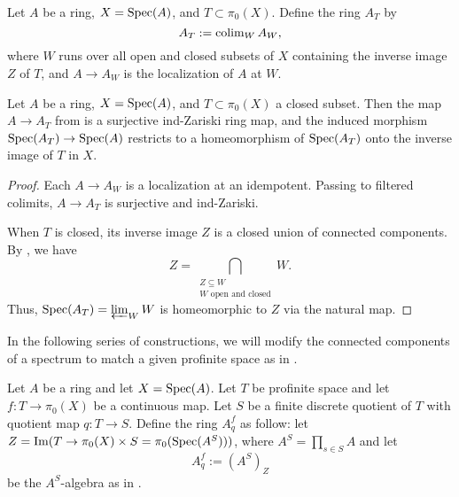\begin{definition}
  \label{def:colim-open-closed-localizations}
  Let $A$ be a ring, $X = \operatorname{Spec}(A)$, and $T \subset \pi_0(X)$. Define the ring $A_T$ by
  \[ 
    A_T := \operatorname{colim}_{W} A_W,
  \]
  where $W$ runs over all open and closed subsets of $X$ containing the inverse image $Z$ of $T$, and $A \to A_W$ is the localization of $A$ at $W$.
\end{definition}

\begin{lemma}
  \label{thm:colim-open-closed-localizations-surj-ind-zariski}
  Let $A$ be a ring, $X = \operatorname{Spec}(A)$, and $T \subset \pi_0(X)$ a closed subset. Then the map $A \to A_T$ from  is a surjective ind-Zariski ring map, and the induced morphism $\operatorname{Spec}(A_T) \to \operatorname{Spec}(A)$ restricts to a homeomorphism of $\operatorname{Spec}(A_T)$ onto the inverse image of $T$ in $X$.
\end{lemma}

\begin{proof}
  Each $A \to A_W$ is a localization at an idempotent. Passing to filtered colimits, $A \to A_T$ is surjective and ind-Zariski.

  When $T$ is closed, its inverse image $Z$ is a closed union of connected components. By , we have
  \[
    Z = \bigcap_{\substack{Z \subseteq W \\ W \text{ open and closed}}} W.
  \]
  Thus, $\operatorname{Spec}(A_T) = \varprojlim_W W$ is homeomorphic to $Z$ via the natural map.
\end{proof}

In the following series of constructions, we will modify the connected components of a spectrum to match a given profinite space as in {\cite[\href{https://stacks.math.columbia.edu/tag/097D}{Tag 097D}]{stacks-project}}.

\begin{definition}
  \label{def:modify-pi0-finite}
  Let $A$ be a ring and let $X = \operatorname{Spec} (A)$. Let $T$ be profinite space and let $f : T \to \pi_0(X)$ be a continuous map. Let \(S\) be a finite discrete quotient of \(T\) with quotient map \(q : T \to S\).  Define the ring $A^f_{q}$ as follow: let $Z = \operatorname{Im} (T \to \pi_0(X) \times S = \pi_0(\operatorname{Spec} (A^{S})))$, where \(A^{S} = \prod_{s \in S} A\) and let
  \[A^f_{q} := (A^{S})_{Z}\] be the $A^S$-algebra as in .
\end{definition}

